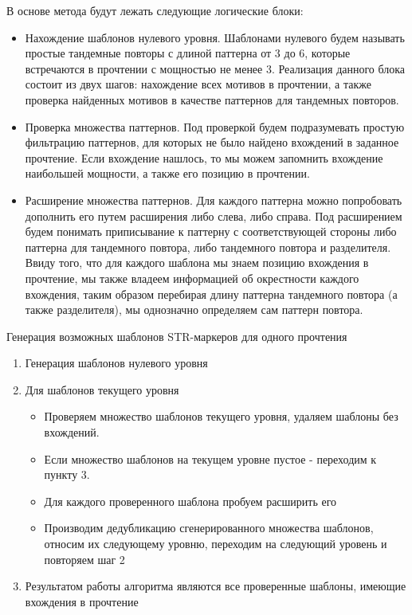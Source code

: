 В основе метода будут лежать следующие логические блоки:
\begin{itemize}
\item Нахождение шаблонов нулевого уровня. Шаблонами нулевого будем называть простые тандемные
повторы с длиной паттерна от 3 до 6, которые встречаются в прочтении с мощностью не менее 3.
Реализация данного блока состоит из двух шагов: нахождение всех мотивов в прочтении, а также
проверка найденных мотивов в качестве паттернов для тандемных повторов.

\item Проверка множества паттернов. Под проверкой будем подразумевать простую фильтрацию паттернов,
для которых не было найдено вхождений в заданное прочтение. Если вхождение нашлось,
то мы можем запомнить вхождение наибольшей мощности, а также его позицию в прочтении.

\item Расширение множества паттернов. Для каждого паттерна можно попробовать дополнить его
путем расширения либо слева, либо справа. Под расширением будем понимать приписывание к паттерну с соответствующей
стороны либо паттерна для тандемного повтора, либо тандемного повтора и разделителя.
Ввиду того, что для каждого шаблона мы знаем позицию вхождения в прочтение,
мы также владеем информацией об окрестности каждого вхождения, таким образом перебирая
длину паттерна тандемного повтора (а также разделителя), мы однозначно определяем сам
паттерн повтора.
\end{itemize}

\Algorithm Генерация возможных шаблонов STR-маркеров для одного прочтения
\begin{enumerate}
  \item Генерация шаблонов нулевого уровня
  \item Для шаблонов текущего уровня
  \begin{itemize}
    \item Проверяем множество шаблонов текущего уровня, удаляем шаблоны без вхождений.
    \item Если множество шаблонов на текущем уровне пустое - переходим к пункту 3.
    \item Для каждого проверенного шаблона пробуем расширить его
    \item Производим дедубликацию сгенерированного множества шаблонов, относим их следующему уровню,
     переходим на следующий уровень и повторяем шаг 2
  \end{itemize}
  \item Результатом работы алгоритма являются все проверенные шаблоны, имеющие вхождения в прочтение
\end{enumerate}

